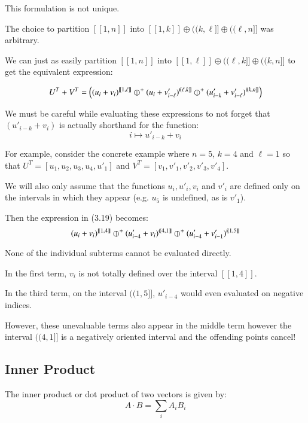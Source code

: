 This formulation is not unique.

The choice to partition $[\![1,n]\!]$ into $[\![1,k]\!] \oplus (\!(k,\ell]\!] \oplus (\!(\ell, n]\!]$ was arbitrary.

We can just as easily partition $[\![1,n]\!]$ into $[\![1,\ell]\!] \oplus (\!(\ell, k]\!] \oplus (\!(k, n]\!]$ to get the equivalent expression:

\begin{equation}
	U^T + V^T = \left( (u_i + v_i)^{[\![1, \ell]\!]} 
		\hjoin[+] (u_{i} + v'_{i-\ell})^{(\!(\ell,k]\!]} 
		\hjoin[+] (u'_{i-k}+v'_{i-\ell})^{(\!(k,n]\!]} \right)
\end{equation}

We must be careful while evaluating these expressions to not forget that $(u'_{i-k} + v_i)$ is actually shorthand for the function:
\begin{equation*}
	i \mapsto u'_{i-k} + v_i
\end{equation*}

For example, consider the concrete example where $n=5$, $k=4$ and $\ell = 1$ so that
$U^T = [ u_1, u_2, u_3, u_4, u'_1 ]$ and
$V^T = [ v_1, v'_1, v'_2, v'_3, v'_4 ]$.

We will also only assume that the functions $u_i, u'_i, v_i$ and $v'_i$ are defined only on the intervals in which they appear (e.g. $u_5$ is undefined, as is $v'_1$).

Then the expression in (3.19) becomes:
\begin{equation}
(u_i + v_i)^{[\![1,4]\!]} \hjoin[+] (u'_{i-4} + v_i)^{(\!(4,1]\!]} \hjoin[+] (u'_{i-4} + v'_{i-1})^{(\!(1,5]\!]}
\end{equation}

None of the individual subterms cannot be evaluated directly.

In the first term, $v_i$ is not totally defined over the interval $[\![1,4]\!]$.

In the third term, on the interval $(\!(1,5]\!]$, $u'_{i-4}$ would even evaluated on negative indices.

However, these unevaluable terms also appear in the middle term however the interval $(\!(4,1]\!]$ is a negatively oriented interval and the offending points cancel!

\subsection{Inner Product}

The inner product or dot product of two vectors is given by:
\begin{equation}
A \cdot B = \sum_i A_i B_i
\end{equation}

